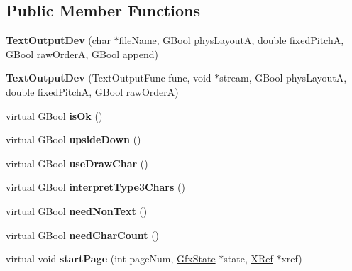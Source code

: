 \subsection*{Public Member Functions}
\begin{DoxyCompactItemize}
\item 
\mbox{\label{class_text_output_dev_a4f861bbfd1e8a2904b88e92dc8d2ec22}} 
{\bfseries Text\+Output\+Dev} (char $\ast$file\+Name, G\+Bool phys\+LayoutA, double fixed\+PitchA, G\+Bool raw\+OrderA, G\+Bool append)
\item 
\mbox{\label{class_text_output_dev_a5ec6a51258d683c49d1025bf0262f597}} 
{\bfseries Text\+Output\+Dev} (Text\+Output\+Func func, void $\ast$stream, G\+Bool phys\+LayoutA, double fixed\+PitchA, G\+Bool raw\+OrderA)
\item 
\mbox{\label{class_text_output_dev_a1b47645aec455e47f7d6f73faf013dc7}} 
virtual G\+Bool {\bfseries is\+Ok} ()
\item 
\mbox{\label{class_text_output_dev_a71671342299d325ea375b7f246aeaa99}} 
virtual G\+Bool {\bfseries upside\+Down} ()
\item 
\mbox{\label{class_text_output_dev_a101d92cc9a7824631dcbd6090c7eba37}} 
virtual G\+Bool {\bfseries use\+Draw\+Char} ()
\item 
\mbox{\label{class_text_output_dev_ab72f539b6320b50e324ab75612f248db}} 
virtual G\+Bool {\bfseries interpret\+Type3\+Chars} ()
\item 
\mbox{\label{class_text_output_dev_a5688c962bf2e7fd5c91e2191da275c1e}} 
virtual G\+Bool {\bfseries need\+Non\+Text} ()
\item 
\mbox{\label{class_text_output_dev_a4dd8d1558c7c5db03180122ce07f4a94}} 
virtual G\+Bool {\bfseries need\+Char\+Count} ()
\item 
\mbox{\label{class_text_output_dev_a05c807ab1571f9411a7cb2ee940fefaf}} 
virtual void {\bfseries start\+Page} (int page\+Num, \hyperlink{class_gfx_state}{Gfx\+State} $\ast$state, \hyperlink{class_x_ref}{X\+Ref} $\ast$xref)

\end{DoxyCompactItemize}
